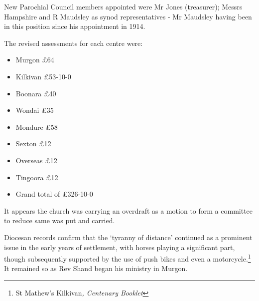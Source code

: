 New Parochial Council members appointed were Mr Jones (treasurer); Messrs Hampshire and R Maudsley as synod representatives - Mr Maudsley having been in this position since his appointment in 1914.



The revised assessments for each centre were:



\begin{itemize}

\item

  Murgon \pounds64

\item

  Kilkivan \pounds53-10-0

\item

  Boonara \pounds40

\item

  Wondai \pounds35

\item

  Mondure \pounds58

\item

  Sexton \pounds12

\item

  Overseas \pounds12

\item

  Tingoora \pounds12

\item

  Grand total of \pounds326-10-0

\end{itemize}



\smallskip


It appears the church was carrying an overdraft as a motion to form a committee to reduce same was put and carried.



Diocesan records confirm that the `tyranny of distance' continued as a prominent issue in the early years of settlement, with horses playing a significant part, though subsequently supported by the use of push bikes and even a motorcycle.\footnote{St Mathew's Kilkivan\emph{, Centenary Booklet}} It remained so as Rev Shand began his ministry in Murgon.


